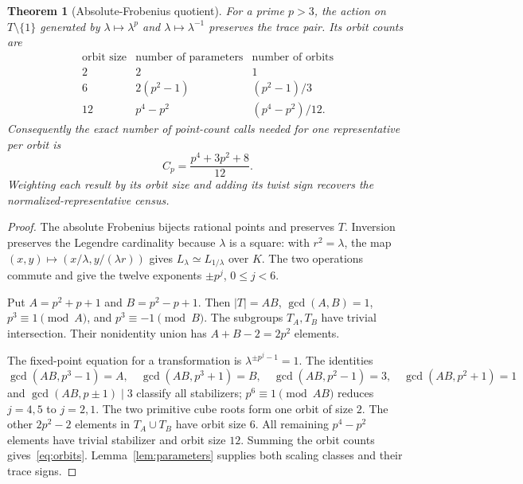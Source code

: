 \documentclass[11pt]{article}
\newtheorem{theorem}{Theorem}
\begin{document}
\begin{theorem}[Absolute-Frobenius quotient]\label{thm:orbits}
For a prime $p>3$, the action on $T\setminus\{1\}$ generated by
$\lambda\mapsto\lambda^p$ and $\lambda\mapsto\lambda^{-1}$
preserves the trace pair. Its orbit counts are
\[
 \begin{array}{c|c|c}
 \text{orbit size}&\text{number of parameters}&\text{number of orbits}\\\hline
 2&2&1\\
 6&2(p^2-1)&(p^2-1)/3\\
 12&p^4-p^2&(p^4-p^2)/12.
 \end{array}
\]
Consequently the exact number of point-count calls needed for one
representative per orbit is
\begin{equation}\label{eq:orbits}
 C_p=\frac{p^4+3p^2+8}{12}.
\end{equation}
Weighting each result by its orbit size and adding its twist sign
recovers the normalized-representative census.
\end{theorem}

\begin{proof}
The absolute Frobenius bijects rational points and preserves $T$.
Inversion preserves the Legendre cardinality because $\lambda$ is a
square: with $r^2=\lambda$, the map
$(x,y)\mapsto(x/\lambda,y/(\lambda r))$ gives
$L_\lambda\simeq L_{1/\lambda}$ over $K$.
The two operations commute and give the twelve exponents
$\pm p^j$, $0\le j<6$.

Put $A=p^2+p+1$ and $B=p^2-p+1$. Then
$|T|=AB$, $\gcd(A,B)=1$, $p^3\equiv1\pmod A$, and
$p^3\equiv-1\pmod B$. The subgroups $T_A,T_B$ have trivial
intersection. Their nonidentity union has
$A+B-2=2p^2$ elements.

The fixed-point equation for a transformation is
$\lambda^{\pm p^j-1}=1$. The identities
\[
 \gcd(AB,p^3-1)=A,\quad \gcd(AB,p^3+1)=B,
 \quad\gcd(AB,p^2-1)=3,\quad\gcd(AB,p^2+1)=1
\]
and $\gcd(AB,p\pm1)\mid3$ classify all stabilizers;
$p^6\equiv1\pmod{AB}$ reduces $j=4,5$ to $j=2,1$.
The two primitive cube roots form one orbit of size $2$.
The other $2p^2-2$ elements in $T_A\cup T_B$ have orbit size $6$.
All remaining $p^4-p^2$ elements have trivial stabilizer and orbit
size $12$. Summing the orbit counts gives~\eqref{eq:orbits}.
Lemma~\ref{lem:parameters} supplies both scaling classes and their
trace signs.
\end{proof}
\end{document}
